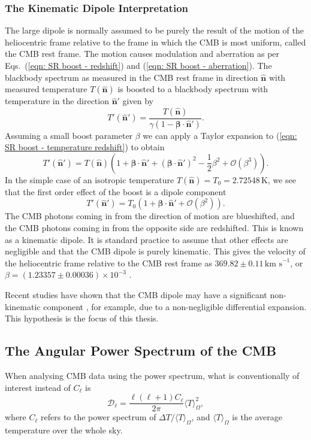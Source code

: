 \documentclass[a4paper,12pt]{report}
\newcommand{\uvec}[1]{\hat{\bm{#1}}}
\begin{document}
\subsubsection{The Kinematic Dipole Interpretation}
The large dipole is normally assumed to be purely the result of the motion of the heliocentric frame relative to the frame in which the CMB is most uniform, called the CMB rest frame. The motion causes modulation and aberration as per Eqs.~(\ref{eqn: SR boost - redshift}) and (\ref{eqn: SR boost - aberration}). The blackbody spectrum as measured in the CMB rest frame in direction $\uvec{n}$ with measured temperature $T(\uvec{n})$ is boosted to a blackbody spectrum with temperature in the direction $\uvec{n}'$ given by
\begin{equation} \label{eqn: SR boost - temperature redshift}
  T'(\uvec{n}') = \frac{T(\uvec{n})}{\gamma(1-\bm{\beta}\cdot\uvec{n}')}.
\end{equation}
Assuming a small boost parameter $\beta$ we can apply a Taylor expansion to (\ref{eqn: SR boost - temperature redshift}) to obtain
\begin{equation}
  T'(\uvec{n}') = T(\uvec{n})\left(1+\bm{\beta}\cdot\uvec{n}'+(\bm{\beta}\cdot\uvec{n}')^2-\frac{1}{2}\beta^2+\mathcal{O}(\beta^3)\right).
\end{equation}
In the simple case of an isotropic temperature $T(\uvec{n})=T_0=2.72548\,$K, we see that the first order effect of the boost is a dipole component
\begin{equation}
  T'(\uvec{n}') = T_0(1+\bm{\beta}\cdot\uvec{n}' + \mathcal{O}(\beta^2)).
\end{equation}
The CMB photons coming in from the direction of motion are blueshifted, and the CMB photons coming in from the opposite side are redshifted. This is known as a kinematic dipole. It is standard practice to assume that other effects are negligible and that the CMB dipole is purely kinematic. This gives the velocity of the heliocentric frame relative to the CMB rest frame as $369.82 \pm 0.11 \,\text{km s}^{-1}$, or $\beta = (1.23357 \pm 0.00036)\times 10^{-3}$ \cite{RN32}.

Recent studies have shown that the CMB dipole may have a significant non-kinematic component \cite{RN35,RN40,RN3,RN34,RN33,RN31,RN68,RN167}, for example, due to a non-negligible differential expansion. This hypothesis is the focus of this thesis.

\subsection{The Angular Power Spectrum of the CMB}
When analysing CMB data using the power spectrum, what is conventionally of interest instead of $C_\ell$ is
\begin{equation} \label{eqn: sph harm D_l definition}
  \mathcal{D}_\ell = \frac{\ell(\ell+1)C_\ell}{2\pi} \langle T \rangle_\Omega^2,
\end{equation}
where $C_\ell$ refers to the power spectrum of $\Delta T / \langle T \rangle_\Omega$, and $\langle T \rangle_\Omega$ is the average temperature over the whole sky.
\end{document}
